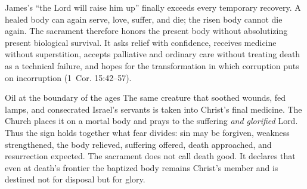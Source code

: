 James's ``the Lord will raise him up'' finally exceeds every temporary recovery. A healed body can again serve, love, suffer, and die; the risen body cannot die again. The sacrament therefore honors the present body without absolutizing present biological survival. It asks relief with confidence, receives medicine without superstition, accepts palliative and ordinary care without treating death as a technical failure, and hopes for the transformation in which corruption puts on incorruption (1~Cor. 15:42--57).

\begin{massbox}{Oil at the boundary of the ages}
The same creature that soothed wounds, fed lamps, and consecrated Israel's servants is taken into Christ's final medicine. The Church places it on a mortal body and prays to the suffering \emph{and glorified} Lord. Thus the sign holds together what fear divides: sin may be forgiven, weakness strengthened, the body relieved, suffering offered, death approached, and resurrection expected. The sacrament does not call death good. It declares that even at death's frontier the baptized body remains Christ's member and is destined not for disposal but for glory.
\end{massbox}
